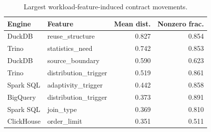 \begin{table}[H]
\centering
\caption{Largest workload-feature-induced contract movements.}
\label{tab:workload}
\small
\begin{tabular}{llrr}
\toprule
Engine & Feature & Mean dist. & Nonzero frac. \\
\midrule
DuckDB & reuse\_structure & 0.827 & 0.854 \\
Trino & statistics\_need & 0.742 & 0.853 \\
DuckDB & source\_boundary & 0.590 & 0.623 \\
Trino & distribution\_trigger & 0.519 & 0.861 \\
Spark SQL & adaptivity\_trigger & 0.442 & 0.858 \\
BigQuery & distribution\_trigger & 0.373 & 0.891 \\
Spark SQL & join\_type & 0.369 & 0.810 \\
ClickHouse & order\_limit & 0.351 & 0.511 \\
\bottomrule
\end{tabular}
\end{table}
